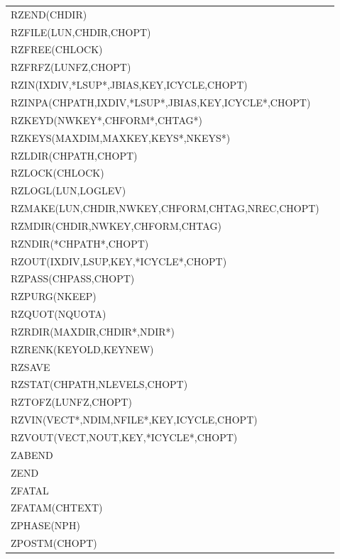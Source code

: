 {\begin{tabular*}{\textwidth}{l@{\extracolsep{\fill}}r}
RZEND(CHDIR)&\pageref{SR_RZEND}\\
RZFILE(LUN,CHDIR,CHOPT)&\pageref{SR_RZFILE}\\
RZFREE(CHLOCK)&\pageref{SR_RZFREE}\\
RZFRFZ(LUNFZ,CHOPT)&\pageref{SR_RZFRFZ}\\
RZIN(IXDIV,*LSUP*,JBIAS,KEY,ICYCLE,CHOPT)&\pageref{SR_RZIN}\\
RZINPA(CHPATH,IXDIV,*LSUP*,JBIAS,KEY,ICYCLE*,CHOPT)&\pageref{SR_RZINPA}\\
RZKEYD(NWKEY*,CHFORM*,CHTAG*)&\pageref{SR_RZKEYD}\\
RZKEYS(MAXDIM,MAXKEY,KEYS*,NKEYS*)&\pageref{SR_RZKEYS}\\
RZLDIR(CHPATH,CHOPT)&\pageref{SR_RZLDIR}\\
RZLOCK(CHLOCK)&\pageref{SR_RZLOCK}\\
RZLOGL(LUN,LOGLEV)&\pageref{SR_RZLOGL}\\
RZMAKE(LUN,CHDIR,NWKEY,CHFORM,CHTAG,NREC,CHOPT)&\pageref{SR_RZMAKE}\\
RZMDIR(CHDIR,NWKEY,CHFORM,CHTAG)&\pageref{SR_RZMDIR}\\
RZNDIR(*CHPATH*,CHOPT)&\pageref{SR_RZNDIR}\\
RZOUT(IXDIV,LSUP,KEY,*ICYCLE*,CHOPT)&\pageref{SR_RZOUT}\\
RZPASS(CHPASS,CHOPT)&\pageref{SR_RZPASS}\\
RZPURG(NKEEP)&\pageref{SR_RZPURG}\\
RZQUOT(NQUOTA)&\pageref{SR_RZQUOT}\\
RZRDIR(MAXDIR,CHDIR*,NDIR*)&\pageref{SR_RZRDIR}\\
RZRENK(KEYOLD,KEYNEW)&\pageref{SR_RZRENK}\\
RZSAVE&\pageref{SR_RZSAVE}\\
RZSTAT(CHPATH,NLEVELS,CHOPT)&\pageref{SR_RZSTAT}\\
RZTOFZ(LUNFZ,CHOPT)&\pageref{SR_RZTOFZ}\\
RZVIN(VECT*,NDIM,NFILE*,KEY,ICYCLE,CHOPT)&\pageref{SR_RZVIN}\\
RZVOUT(VECT,NOUT,KEY,*ICYCLE*,CHOPT)&\pageref{SR_RZVOUT}\\[2mm]
ZABEND&\pageref{SR_ZABEND}\\
ZEND&\pageref{SR_ZEND}\\
ZFATAL&\pageref{SR_ZFATAL}\\
ZFATAM(CHTEXT)&\pageref{SR_ZFATAM}\\
ZPHASE(NPH)&\pageref{SR_ZPHASE}\\
ZPOSTM(CHOPT)&\pageref{SR_ZPOSTM}\\

\end{tabular*}}
